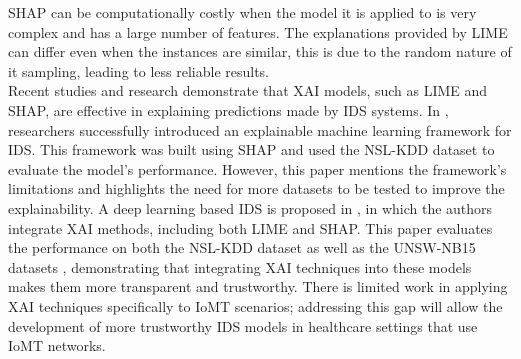 \documentclass[11pt,a4paper]{article}
\begin{document}
SHAP can be computationally costly when the model it is applied to is very complex and has a large number of features. The explanations provided by LIME can differ even when the instances are similar, this is due to the random nature of it sampling, leading to less reliable results.
\\
Recent studies and research demonstrate that XAI models, such as LIME and SHAP, are effective in explaining predictions made by IDS systems. In \cite{wang2020explainable}, researchers successfully introduced an explainable machine learning framework for IDS. This framework was built using SHAP and used the NSL-KDD dataset \cite{nslkdddataset} to evaluate the model’s performance. However, this paper mentions the framework’s limitations and highlights the need for more datasets to be tested to improve the explainability. 
A deep learning based IDS is proposed in \cite{sharmaxai2024}, in which the authors integrate XAI methods, including both LIME and SHAP. This paper evaluates the performance on both the NSL-KDD dataset as well as the UNSW-NB15 datasets \cite{nslkdddataset, unswbn15dataset}, demonstrating that integrating XAI techniques into these models makes them more transparent and trustworthy.
There is limited work in applying XAI techniques specifically to IoMT scenarios; addressing this gap will allow the development of more trustworthy IDS models in healthcare settings that use IoMT networks.
\end{document}
